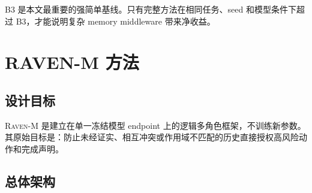 \documentclass[12pt,a4paper]{ctexart}
\newcommand{\ravenm}{\textsc{Raven-M}}
\begin{document}
B3 是本文最重要的强简单基线。只有完整方法在相同任务、seed 和模型条件下超过 B3，才能说明复杂 memory middleware 带来净收益。

\section{RAVEN-M 方法}

\subsection{设计目标}

\ravenm{} 是建立在单一冻结模型 endpoint 上的逻辑多角色框架，不训练新参数。其原始目标是：防止未经证实、相互冲突或作用域不匹配的历史直接授权高风险动作和完成声明。

\subsection{总体架构}
\end{document}
